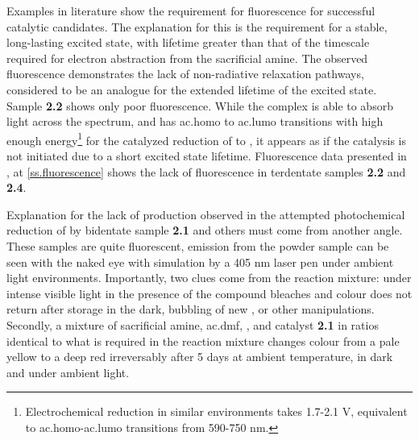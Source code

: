 Examples in literature  show the requirement for fluorescence for successful catalytic candidates. The explanation for this is the requirement for a stable, long-lasting excited state, with lifetime greater than that of the timescale required for electron abstraction from the sacrificial amine. The observed fluorescence demonstrates the lack of non-radiative relaxation pathways, considered to be an analogue for the extended lifetime of the excited state. Sample \textbf{2.2} shows only poor fluorescence. While the complex is able to absorb light across the spectrum, and has \gls{ac.homo} to \gls{ac.lumo} transitions with high enough energy\footnote{Electrochemical reduction in similar environments takes 1.7-2.1 V, equivalent to \gls{ac.homo}-\gls{ac.lumo} transitions from 590-750 nm\autocite{grills2014}.} for the catalyzed reduction of  to , it appears as if the catalysis is not initiated due to a short excited state lifetime. Fluorescence data presented in , at \autoref{ss.fluorescence} shows the lack of fluorescence in terdentate samples \textbf{2.2} and \textbf{2.4}.

Explanation for the lack of  production observed in the attempted photochemical reduction of  by bidentate sample \textbf{2.1} and others must come from another angle. These samples are quite fluorescent, emission from the powder sample can be seen with the naked eye with simulation by a 405 nm laser pen under ambient light environments. Importantly, two clues come from the reaction mixture: under intense visible light in the presence of  the compound bleaches and colour does not return after storage in the dark, bubbling of new , or other manipulations. Secondly, a mixture of sacrificial amine, \gls{ac.dmf}, , and catalyst \textbf{2.1} in ratios identical to what is required in the reaction mixture changes colour from a pale yellow to a deep red irreversably after 5 days at ambient temperature, in dark and under ambient light. 



